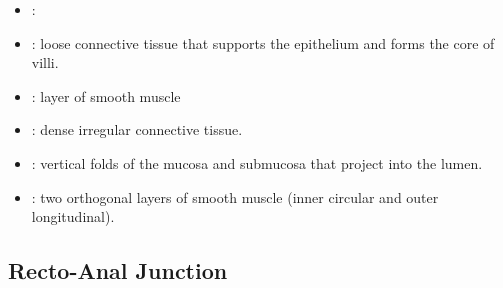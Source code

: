 \begin{itemize}
\begin{multicols}{2}
\begin{itemize}
    \item {}:
    
    \begin{center}
    \end{center}
    
    \item {}: loose connective tissue that supports the epithelium and forms the core of villi.
    
    \begin{center}
    \end{center}
    
    \item {}: layer of smooth muscle
    
    \begin{center}
    \end{center}
    
    \item {}: dense irregular connective tissue.
    
    \begin{center}
    \end{center}
    
    \item {}: vertical folds of the mucosa and submucosa that project into the lumen.
    
    \begin{center}
    \end{center}
    
    \item {}: two orthogonal layers of smooth muscle (inner circular and outer longitudinal).
    
    \begin{center}
    \end{center}
  \end{itemize}
  \end{multicols}

  \subsection{Recto-Anal Junction}
  \begin{center}
  \end{center}
  

\end{itemize}
